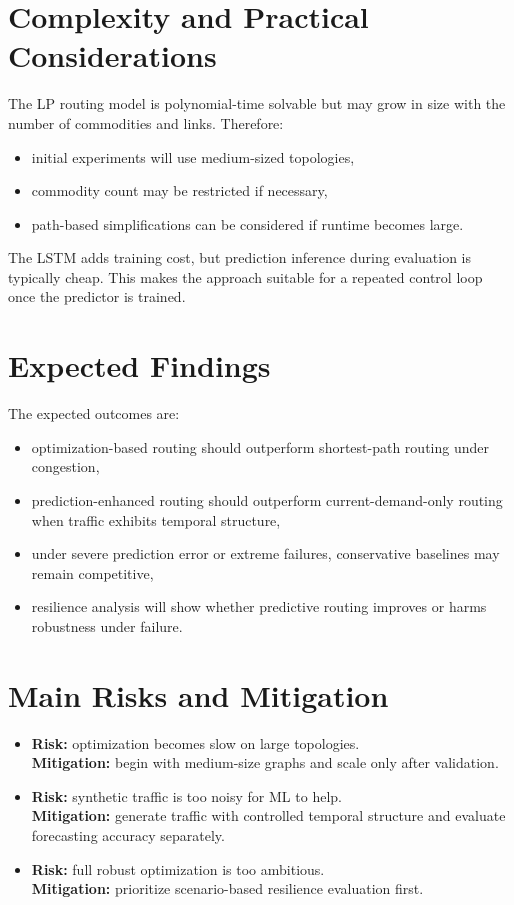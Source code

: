 \documentclass[11pt]{article}
\begin{document}
\section{Complexity and Practical Considerations}
The LP routing model is polynomial-time solvable but may grow in size with the number of commodities and links. Therefore:
\begin{itemize}
    \item initial experiments will use medium-sized topologies,
    \item commodity count may be restricted if necessary,
    \item path-based simplifications can be considered if runtime becomes large.
\end{itemize}

The LSTM adds training cost, but prediction inference during evaluation is typically cheap. This makes the approach suitable for a repeated control loop once the predictor is trained.

\section{Expected Findings}
The expected outcomes are:
\begin{itemize}
    \item optimization-based routing should outperform shortest-path routing under congestion,
    \item prediction-enhanced routing should outperform current-demand-only routing when traffic exhibits temporal structure,
    \item under severe prediction error or extreme failures, conservative baselines may remain competitive,
    \item resilience analysis will show whether predictive routing improves or harms robustness under failure.
\end{itemize}

\section{Main Risks and Mitigation}
\begin{itemize}
    \item \textbf{Risk:} optimization becomes slow on large topologies. \\
    \textbf{Mitigation:} begin with medium-size graphs and scale only after validation.
    \item \textbf{Risk:} synthetic traffic is too noisy for ML to help. \\
    \textbf{Mitigation:} generate traffic with controlled temporal structure and evaluate forecasting accuracy separately.
    \item \textbf{Risk:} full robust optimization is too ambitious. \\
    \textbf{Mitigation:} prioritize scenario-based resilience evaluation first.
\end{itemize}
\end{document}
